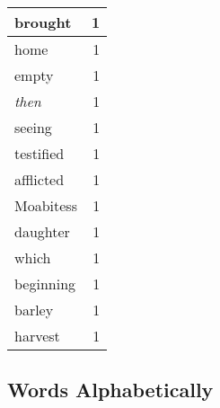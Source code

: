 \begin{center}
\begin{longtable}{l|r}
brought & 1 \\ \hline
home & 1 \\ \hline
empty & 1 \\ \hline
\emph{then} & 1 \\ \hline
seeing & 1 \\ \hline
testified & 1 \\ \hline
afflicted & 1 \\ \hline
Moabitess & 1 \\ \hline
daughter & 1 \\ \hline
which & 1 \\ \hline
beginning & 1 \\ \hline
barley & 1 \\ \hline
harvest & 1 \\ \hline
\end{longtable}
\end{center}



\normalsize



\subsection{Words Alphabetically}


